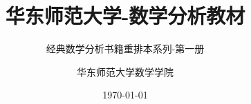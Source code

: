 \title{华东师范大学-数学分析教材}
\subtitle{经典数学分析书籍重排本系列-第一册}

\author{华东师范大学数学学院}
\date{\today}


\setcounter{tocdepth}{3}


\usepackage{array}
\newcommand{\ccr}[1]{\makecell{{\color{#1}\rule{1cm}{1cm}}}}

\usepackage{cprotect}



\usepackage{adjustbox}%
\newcommand{\HRule}{\begin{center}\rule{0.9\linewidth}{0.2mm}\end{center}}%
\providecommand{\arccot}{\operatorname{arccot}}
